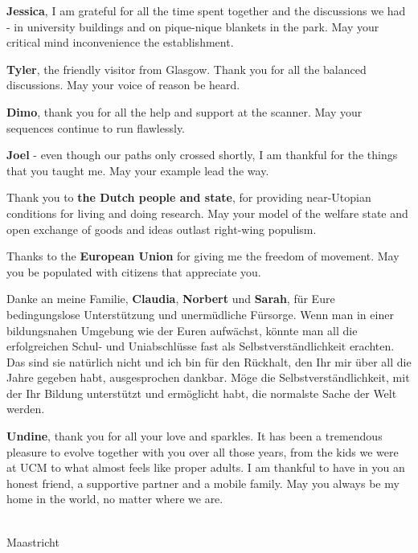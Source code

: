 \textbf{Jessica}, I am grateful for all the time spent together and the discussions we had - in university buildings and on pique-nique blankets in the park. May your critical mind inconvenience the establishment.

\textbf{Tyler}, the friendly visitor from Glasgow. Thank you for all the balanced discussions. May your voice of reason be heard.

\textbf{Dimo}, thank you for all the help and support at the scanner. May your sequences continue to run flawlessly. 

\textbf{Joel} - even though our paths only crossed shortly, I am thankful for the things that you taught me. May your example lead the way.

Thank you to \textbf{the Dutch people and state}, for providing near-Utopian conditions for living and doing research. May your model of the welfare state and open exchange of goods and ideas outlast right-wing populism.

Thanks to the \textbf{European Union} for giving me the freedom of movement. May you be populated with citizens that appreciate you.

Danke an meine Familie, \textbf{Claudia}, \textbf{Norbert} und \textbf{Sarah}, für Eure bedingungslose Unterstützung und unermüdliche Fürsorge. Wenn man in einer bildungsnahen Umgebung wie der Euren aufwächst, könnte man all die erfolgreichen Schul- und Uniabschlüsse fast als Selbstverständlichkeit erachten. Das sind sie natürlich nicht und ich bin für den Rückhalt, den Ihr mir über all die Jahre gegeben habt, ausgesprochen dankbar. Möge die Selbstverständlichkeit, mit der Ihr Bildung unterstützt und ermöglicht habt, die normalste Sache der Welt werden.

\textbf{Undine}, thank you for all your love and sparkles. It has been a tremendous pleasure to evolve together with you over all those years, from the kids we were at UCM to what almost feels like proper adults. I am thankful to have in you an honest friend, a supportive partner and a mobile family. May you always be my home in the world, no matter where we are.

{\flushright \thesisauthor \\ Maastricht \\ \thesisdate \\ }